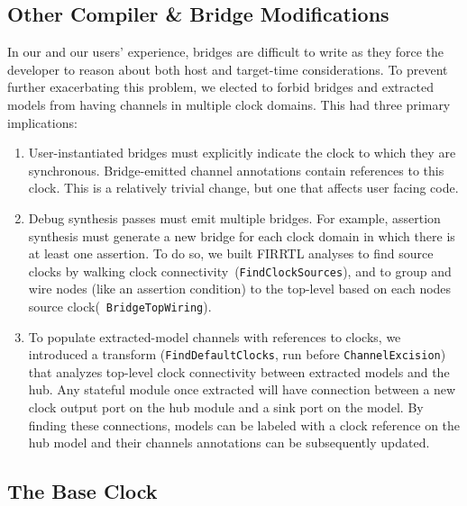 \subsection{Other Compiler \& Bridge Modifications}

In our and our users' experience, bridges are difficult to write as they force
the developer to reason about both host and target-time considerations. To
prevent further exacerbating this problem, we elected to forbid bridges and
extracted models from having channels in multiple clock domains. This had three
primary implications:

\begin{enumerate}
\item User-instantiated bridges must explicitly indicate the clock to which
they are synchronous. Bridge-emitted channel annotations contain references to
this clock. This is a relatively trivial change, but one that affects user
facing code.

\item Debug synthesis passes must emit multiple bridges. For example, assertion
synthesis must generate a new bridge for each clock domain in which there is at
least one assertion. To do so, we built FIRRTL analyses to find source clocks
        by walking clock connectivity~(\texttt{FindClockSources}), and to group and wire
nodes (like an assertion condition) to the top-level based on each nodes source
clock(~\texttt{BridgeTopWiring}).

\item To populate extracted-model channels with references to clocks, we
introduced a transform (\texttt{FindDefaultClocks}, run before \texttt{ChannelExcision}) that analyzes top-level
clock connectivity between extracted models and the hub. Any stateful module
once extracted will have connection between a new clock output port on the hub
module and a sink port on the model. By
finding these connections, models can be labeled with a clock reference on the
hub model and their channels annotations can be subsequently updated.
\end{enumerate}

\subsection{The Base Clock}

